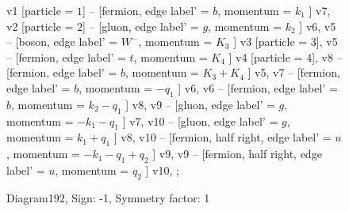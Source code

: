 \documentclass{revtex4}
\begin{document}
\begin{figure}[!htb]
\begin{center}
{    %
v1 [particle = \(1\)] -- [fermion, edge label' = \(b\), momentum = \(k_{1}\) ] v7, 
v2 [particle = \(2\)] -- [gluon, edge label' = \(g\), momentum = \(k_{2}\) ] v6, 
v5 -- [boson, edge label' = \(W^{-}\), momentum = \(K_{3}\) ] v3 [particle = \(3\)], 
v5 -- [fermion, edge label' = \(t\), momentum = \(K_{4}\) ] v4 [particle = \(4\)], 
v8 -- [fermion, edge label' = \(b\), momentum = \(K_{3} + K_{4}\) ] v5, 
v7 -- [fermion, edge label' = \(b\), momentum = \(-q_{1}\) ] v6, 
v6 -- [fermion, edge label' = \(b\), momentum = \(k_{2} - q_{1}\) ] v8, 
v9 -- [gluon, edge label' = \(g\), momentum = \(-k_{1} - q_{1}\) ] v7, 
v10 -- [gluon, edge label' = \(g\), momentum = \(k_{1} + q_{1}\) ] v8, 
v10 -- [fermion, half right, edge label' = \(u\), momentum = \(-k_{1} - q_{1} + q_{2}\) ] v9, 
v9 -- [fermion, half right, edge label' = \(u\), momentum = \(q_{2}\) ] v10, 
};
\end{center}
\caption{Diagram192, Sign: -1, Symmetry factor: 1}
\end{figure}
\newpage
\end{document}
